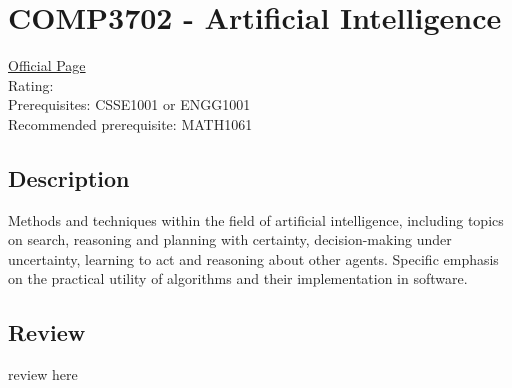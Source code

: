 \hypertarget{COMP3702}{\section{COMP3702 - Artificial Intelligence}}

\large
\textcolor{turbo_purple}{\href{https://my.uq.edu.au/programs-courses/course.html?course_code=COMP3702}{Official Page}} \\
Rating: \cstar\cstar\cstar\cstar\ostar \\
Prerequisites: CSSE1001 or ENGG1001 \\
Recommended prerequisite: MATH1061

\normalsize
\subsection*{Description}
Methods and techniques within the field of artificial intelligence, including topics on search, reasoning and planning with certainty, decision-making under uncertainty, learning to act and reasoning about other agents.
Specific emphasis on the practical utility of algorithms and their implementation in software.

\subsection*{Review}
review here
